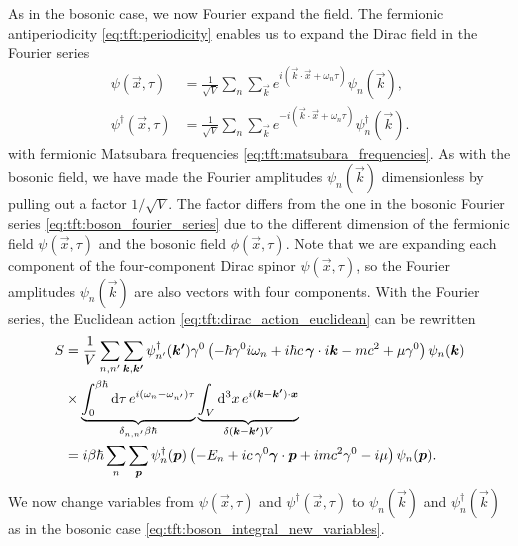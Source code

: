 As in the bosonic case, we now Fourier expand the field.
The fermionic antiperiodicity \eqref{eq:tft:periodicity} enables us to expand the Dirac field in the Fourier series
\begin{subequations}
\begin{align}
	\psi(\vec{x}, \tau)         &= \frac{1}{\sqrt{V}} \sum_n \sum_\vec{k} e^{i (\vec{k} \cdot \vec{x} + \omega_n \tau)} \psi_{n}(\vec{k}), \\
	\psi^\dagger(\vec{x}, \tau) &= \frac{1}{\sqrt{V}} \sum_n \sum_\vec{k} e^{-i (\vec{k} \cdot \vec{x} + \omega_n \tau)} \psi_{n}^\dagger(\vec{k}) .
\label{eq:tft:dirac_fourier_series}
\end{align}
\end{subequations}
with fermionic Matsubara frequencies \eqref{eq:tft:matsubara_frequencies}.
As with the bosonic field, we have made the Fourier amplitudes $\psi_n(\vec{k})$ dimensionless by pulling out a factor $1/\sqrt{V}$.
The factor differs from the one in the bosonic Fourier series \eqref{eq:tft:boson_fourier_series} due to the different dimension of the fermionic field $\psi(\vec{x}, \tau)$ and the bosonic field $\phi(\vec{x}, \tau)$.
Note that we are expanding each component of the four-component Dirac spinor $\psi(\vec{x}, \tau)$, so the Fourier amplitudes $\psi_n(\vec{k})$ are also vectors with four components.
With the Fourier series, the Euclidean action \eqref{eq:tft:dirac_action_euclidean} can be rewritten
\begin{equation}
\begin{split}
	S & = \frac{1}{V} \sum_{n,n'} \sum_{{\bm{k}},{\bm{k'}}} \psi^\dagger_{n'}({\bm{k'}}) \gamma^0 \left( -\hbar \gamma^0 i \omega_n + i \hbar c \, {\bm{\gamma}} \cdot i {\bm{k}} - m c^2 + \mu \gamma^0 \right) \psi_n({\bm{k}}) \\
	  & \times \underbrace{\int_0^{\beta \hbar} \mathop{}\!\mathrm{d} \tau \, e^{i(\omega_n-\omega_{n'})\tau}}_{\delta_{n,n'} \beta \hbar} \underbrace{\int_V \mathop{}\!\mathrm{d}^3 x \, e^{i({\bm{k}}-{\bm{k'}})\cdot{\bm{x}}}}_{\delta({\bm{k}} - {\bm{k'}}) V} \\
	  & = i \beta \hbar \sum_{n}   \sum_{{\bm{p}}}         \psi^\dagger_n({\bm{p}})          \left( -E_n + i c \, \gamma^0 {\bm{\gamma}} \cdot {\bm{p}} + i m c^2 \gamma^0 - i \mu \right) \psi_n({\bm{p}}) . \\
\end{split}
\end{equation}
We now change variables from $\psi(\vec{x}, \tau)$ and $\psi^\dagger(\vec{x}, \tau)$ to $\psi_n(\vec{k})$ and $\psi^\dagger_n(\vec{k})$ as in the bosonic case \eqref{eq:tft:boson_integral_new_variables}.
